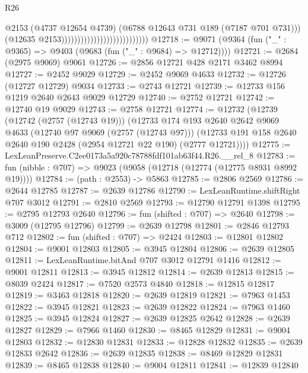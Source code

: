 \begin{lexlean}{R26}
\begin{coremodule}
                                                          @2153
                                                          (@4737 @12654 @4739)
                                                          (@6788
                                                            @12643
                                                            @731
                                                            @189
                                                            (@7187 @701 @731)))
                                                        (@12635 @2153)))))))))))))))))))))))))))
@12718 := @9071 (@9364 (fun ("_" : @9365) => @9403 (@9683 (fun ("_" : @9684) => @12712))))
@12721 := @2684 (@2975 @9069) @9061
@12726 := @2856 @12721 @428 @2171 @3462 @8994
@12727 := @2452 @9029
@12729 := @2452 @9069 @4633
@12732 := @12726 (@12727 @12729) @9034
@12733 := @2743 @12721
@12739 := @12733 @156 @1219 @2640 @2643 @9029 @12729
@12740 := @2752 @12721
@12742 := @12740 @19 @9029
@12743 := @2758 @12721
@12774 := @12732
    (@12739
      (@12742 (@2757 (@12743 @19)))
      (@12733
        @174
        @193
        @2640
        @2642
        @9069
        @4633
        (@12740 @97 @9069 (@2757 (@12743 @97)))
        (@12733 @191 @158 @2640 @2640 @190 @2428 (@2954 @12721 @22 @190) (@2777 @12721))))
@12775 := LexLeanPreserve.C2ee0173a5a920c78788fdf101ab63f44.R26.__rel_8
@12783 := fun (nibble : @707) => @9023 (@9058 (@12718 (@12774 (@12775 @8931 @8992 @19))))
@12784 := (path : @2553) -> @5863
@12785 := @2806 @2569
@12786 := @2644 @12785
@12787 := @2639 @12786
@12790 := LexLeanRuntime.shiftRight @707 @3012
@12791 := @2810 @2569
@12793 := @12790 @12791 @1398
@12795 := @2795 @12793 @2640
@12796 := fun (shifted : @707) => @2640
@12798 := @3009 (@12795 @12796)
@12799 := @2639 @12798
@12801 := @2846 @12793 @712
@12802 := fun (shifted : @707) => @2424
@12803 := @12801 @12802
@12804 := @9001 @12803
@12805 := @3945 @12804
@12806 := @2639 @12805
@12811 := LexLeanRuntime.bitAnd @707 @3012 @12791 @1416
@12812 := @9001 @12811
@12813 := @3945 @12812
@12814 := @2639 @12813
@12815 := @8039 @2424
@12817 := @7520 @2573 @4840
@12818 := @12815 @12817
@12819 := @3463 @12818
@12820 := @2639 @12819
@12821 := @7963 @1453
@12822 := @3945 @12821
@12823 := @2639 @12822
@12824 := @7963 @1460
@12825 := @3945 @12824
@12827 := @2639 @12825 @2642
@12828 := @2639 @12827
@12829 := @7966 @1460
@12830 := @8465 @12829
@12831 := @9004 @12803
@12832 := @12830 @12831
@12833 := @12828 @12832
@12835 := @2639 @12833 @2642
@12836 := @2639 @12835
@12838 := @8469 @12829 @12831
@12839 := @8465 @12838
@12840 := @9004 @12811
@12841 := @12839 @12840

\end{coremodule}
\end{lexlean}
